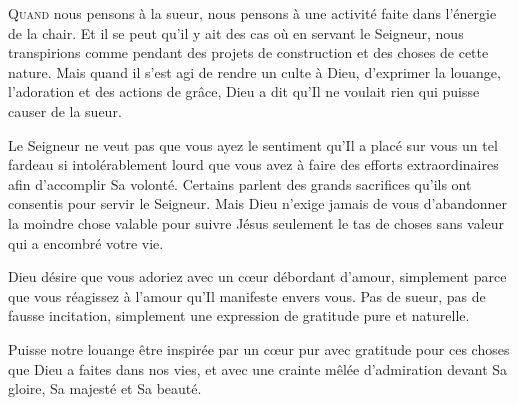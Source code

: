 \dvrule







\lettrine{Q}{uand} nous pensons à la sueur,
 nous pensons à une activité faite dans l'énergie de la chair.
 Et il se peut qu'il y ait des cas où en servant le Seigneur,
 nous transpirions \ocadr comme pendant des projets de construction
 et des choses de cette nature. Mais quand il s'est agi de rendre
 un culte à Dieu, d'exprimer la louange, l'adoration
 et des actions de grâce, Dieu a dit qu'Il ne voulait rien
 qui puisse causer de la sueur. 



Le Seigneur ne veut pas que vous ayez le sentiment qu'Il a placé sur vous
 un tel fardeau si intolérablement lourd que vous avez à faire des efforts
 extraordinaires afin d'accomplir Sa volonté. Certains parlent
 des grands sacrifices 
qu'ils ont consentis pour servir le Seigneur.
 Mais Dieu n'exige jamais de vous d'abandonner la moindre chose valable
 pour suivre Jésus \ocadr seulement le tas de choses sans valeur
 qui a encombré votre vie. 

Dieu désire que vous adoriez avec un c\oe{}ur débordant d'amour,
 simplement parce que vous réagissez à l'amour qu'Il manifeste envers vous.
 Pas de sueur, pas de fausse incitation,
 simplement une expression de gratitude pure et naturelle. 

Puisse notre louange être inspirée par un c\oe{}ur pur
 \ocadr avec gratitude pour ces choses que Dieu a faites dans nos vies, 
et avec une crainte mêlée d'admiration devant Sa gloire,
 Sa majesté et Sa beauté. 

